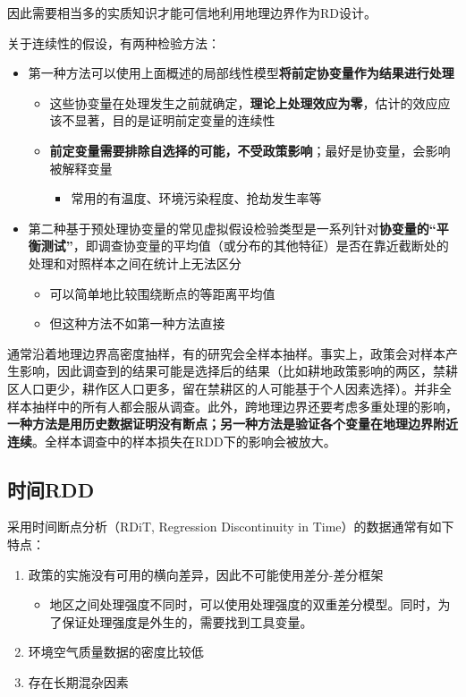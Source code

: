 \documentclass[11pt,a4paper]{ctexart}
\begin{document}
因此需要相当多的实质知识才能可信地利用地理边界作为RD设计。

关于连续性的假设，有两种检验方法：

\begin{itemize}
\item
  第一种方法可以使用上面概述的局部线性模型\textbf{将前定协变量作为结果进行处理}

  \begin{itemize}
  \item
    这些协变量在处理发生之前就确定，\textbf{理论上处理效应为零}，估计的效应应该不显著，目的是证明前定变量的连续性
  \item
    \textbf{前定变量需要排除自选择的可能，不受政策影响}；最好是协变量，会影响被解释变量

    \begin{itemize}
    \item
      常用的有温度、环境污染程度、抢劫发生率等
    \end{itemize}
  \end{itemize}
\item
  第二种基于预处理协变量的常见虚拟假设检验类型是一系列针对\textbf{协变量的``平衡测试''}，即调查协变量的平均值（或分布的其他特征）是否在靠近截断处的处理和对照样本之间在统计上无法区分

  \begin{itemize}
  \item
    可以简单地比较围绕断点的等距离平均值
  \item
    但这种方法不如第一种方法直接
  \end{itemize}
\end{itemize}

通常沿着地理边界高密度抽样，有的研究会全样本抽样。事实上，政策会对样本产生影响，因此调查到的结果可能是选择后的结果（比如耕地政策影响的两区，禁耕区人口更少，耕作区人口更多，留在禁耕区的人可能基于个人因素选择）。并非全样本抽样中的所有人都会服从调查。此外，跨地理边界还要考虑多重处理的影响，\textbf{一种方法是用历史数据证明没有断点；另一种方法是验证各个变量在地理边界附近连续}。全样本调查中的样本损失在RDD下的影响会被放大。

\subsection{时间RDD}

采用时间断点分析（RDiT, Regression Discontinuity in
Time）的数据通常有如下特点：

\begin{enumerate}
\def\labelenumi{\arabic{enumi}.}
\item
  政策的实施没有可用的横向差异，因此不可能使用差分-差分框架

  \begin{itemize}
  \item
    地区之间处理强度不同时，可以使用处理强度的双重差分模型。同时，为了保证处理强度是外生的，需要找到工具变量。
  \end{itemize}
\item
  环境空气质量数据的密度比较低
\item
  存在长期混杂因素
\end{enumerate}
\end{document}
